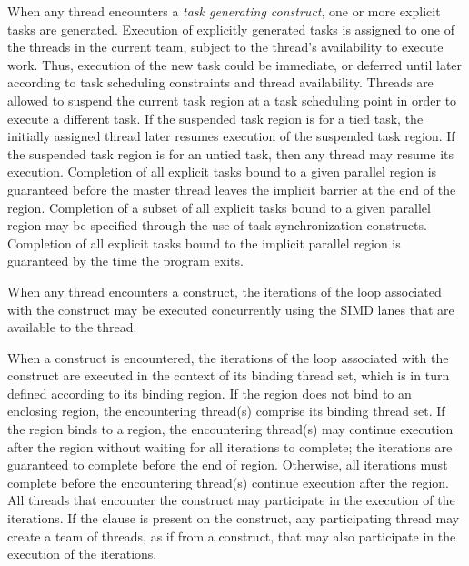 When any thread encounters a \emph{task generating construct}, one or more explicit tasks are generated.
Execution of explicitly generated tasks is assigned to one of the threads in the current
team, subject to the thread's availability to execute work. Thus, execution of the new
task could be immediate, or deferred until later according to task scheduling constraints
and thread availability. Threads are allowed to suspend the current task region at a task
scheduling point in order to execute a different task. If the suspended task region is for
a tied task, the initially assigned thread later resumes execution of the suspended task
region. If the suspended task region is for an untied task, then any thread may resume its
execution. Completion of all explicit tasks bound to a given parallel region is guaranteed
before the master thread leaves the implicit barrier at the end of the region. Completion
of a subset of all explicit tasks bound to a given parallel region may be specified through
the use of task synchronization constructs. Completion of all explicit tasks bound to the
implicit parallel region is guaranteed by the time the program exits.

When any thread encounters a  construct, the iterations of the loop associated with
the construct may be executed concurrently using the SIMD lanes that are available to
the thread.


When a  construct is encountered, the iterations of the loop
associated with the construct are executed in the context of its binding thread
set, which is in turn defined according to its binding region. If the
 region does not bind to an enclosing  region, the
encountering thread(s) comprise its binding thread set. If the 
region binds to a  region, the encountering thread(s) may continue
execution after the  region without waiting for all iterations to
complete; the iterations are guaranteed to complete before the end of
 region.  Otherwise, all iterations must complete before the
encountering thread(s) continue execution after the  region. All
threads that encounter the  construct may participate in the
execution of the iterations. If the  clause is present on the
construct, any participating thread may create a team of threads, as if from a
 construct, that may also participate in the execution of the
iterations.



